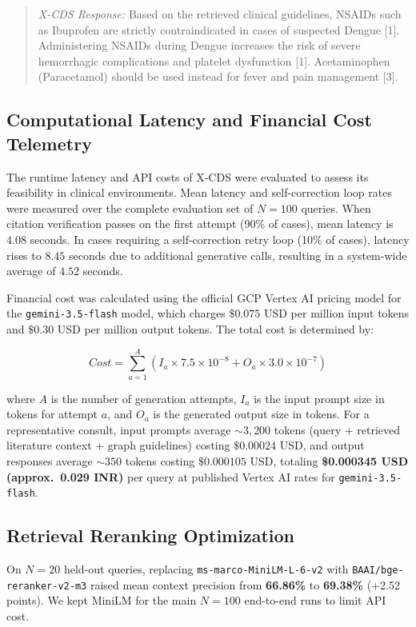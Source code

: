 \begin{quote}
\small
\textit{X-CDS Response:} Based on the retrieved clinical guidelines, NSAIDs such as Ibuprofen are strictly contraindicated in cases of suspected Dengue [1]. Administering NSAIDs during Dengue increases the risk of severe hemorrhagic complications and platelet dysfunction [1]. Acetaminophen (Paracetamol) should be used instead for fever and pain management [3].
\end{quote}

\subsection{Computational Latency and Financial Cost Telemetry}
The runtime latency and API costs of X-CDS were evaluated to assess its feasibility in clinical environments. Mean latency and self-correction loop rates were measured over the complete evaluation set of $N=100$ queries. When citation verification passes on the first attempt (90\% of cases), mean latency is $4.08$ seconds. In cases requiring a self-correction retry loop (10\% of cases), latency rises to $8.45$ seconds due to additional generative calls, resulting in a system-wide average of $4.52$ seconds.

Financial cost was calculated using the official GCP Vertex AI pricing model for the \texttt{gemini-3.5-flash} model, which charges $\$0.075$ USD per million input tokens and $\$0.30$ USD per million output tokens. The total cost is determined by:

\begin{equation}
Cost = \sum_{a=1}^{A} \left( I_a \times 7.5 \times 10^{-8} + O_a \times 3.0 \times 10^{-7} \right)
\end{equation}

where $A$ is the number of generation attempts, $I_a$ is the input prompt size in tokens for attempt $a$, and $O_a$ is the generated output size in tokens. For a representative consult, input prompts average $\sim3,200$ tokens (query + retrieved literature context + graph guidelines) costing $\$0.00024$ USD, and output responses average $\sim350$ tokens costing $\$0.000105$ USD, totaling \textbf{\$0.000345 USD (approx.\ 0.029 INR)} per query at published Vertex AI rates for \texttt{gemini-3.5-flash}.

\subsection{Retrieval Reranking Optimization}
On $N=20$ held-out queries, replacing \texttt{ms-marco-MiniLM-L-6-v2} with \texttt{BAAI/bge-reranker-v2-m3} raised mean context precision from \textbf{66.86\%} to \textbf{69.38\%} (+2.52 points). We kept MiniLM for the main $N=100$ end-to-end runs to limit API cost.
